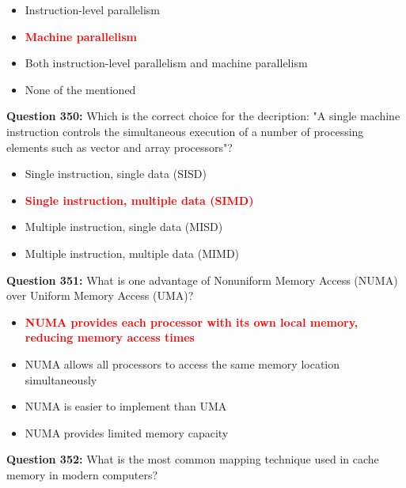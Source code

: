 \documentclass[12pt,a4paper]{article}
\begin{document}
\begin{itemize}
    \item[\textbf{A.}] Instruction-level parallelism
    \item[\textbf{B.}] \textcolor{red}{\textbf{Machine parallelism}}
    \item[\textbf{C.}] Both instruction-level parallelism and machine parallelism
    \item[\textbf{D.}] None of the mentioned
\end{itemize}

\vspace{0.5cm}

\textbf{Question 350:} Which is the correct choice for the decription: "A single machine instruction controls the simultaneous execution of a number of processing elements such as vector and array processors"?

\begin{itemize}
    \item[\textbf{A.}] Single instruction, single data (SISD)
    \item[\textbf{B.}] \textcolor{red}{\textbf{Single instruction, multiple data (SIMD)}}
    \item[\textbf{C.}] Multiple instruction, single data (MISD)
    \item[\textbf{D.}] Multiple instruction, multiple data (MIMD)
\end{itemize}

\vspace{0.5cm}

\textbf{Question 351:} What is one advantage of Nonuniform Memory Access (NUMA) over Uniform Memory Access (UMA)?

\begin{itemize}
    \item[\textbf{A.}] \textcolor{red}{\textbf{NUMA provides each processor with its own local memory, reducing memory access times}}
    \item[\textbf{B.}] NUMA allows all processors to access the same memory location simultaneously
    \item[\textbf{C.}] NUMA is easier to implement than UMA
    \item[\textbf{D.}] NUMA provides limited memory capacity
\end{itemize}

\vspace{0.5cm}

\textbf{Question 352:} What is the most common mapping technique used in cache memory in modern computers?
\end{document}
